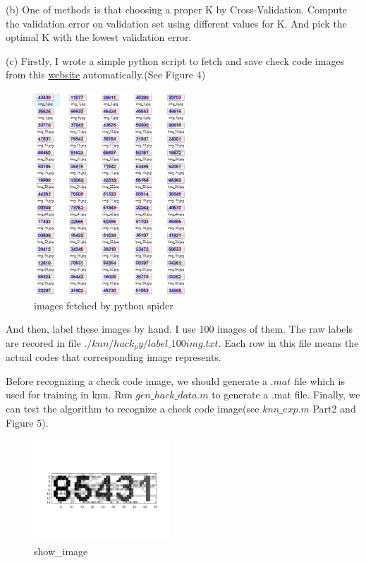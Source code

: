 \documentclass[11pt]{article} %
\begin{document}
(b) 
One of methods is that choosing a proper K by Cross-Validation. Compute the validation error on validation set using different values for K. And pick the optimal K with the lowest validation error.

(c)
Firstly, I wrote a simple python script to fetch and save check code images from this \href{http://jwbinfosys.zju.edu.cn/default2.aspx}{website} automatically.(See Figure 4)

\begin{figure}
\centering
\includegraphics[height=3in]{knn_spider.jpg}  %
\caption{images fetched by python spider}
\label{fig4}
\end{figure}

And then, label these images by hand. I use 100 images of them. The raw labels are recored in file  $./knn/hack_py/label\_100img.txt$. Each row in this file means the actual codes that corresponding image represents.

Before recognizing a check code image, we should generate a $.mat$ file which is used for training in knn. Run $gen\_hack\_data.m$ to generate a .mat file.
Finally, we can test the algorithm to recognize a check code image(see $knn\_exp.m$ Part2 and Figure 5).

\begin{figure}
\centering
\includegraphics[width=2in]{knn_showimg.jpg}  %
\caption{show\_image}
\label{fig5}
\end{figure}
\end{document}
